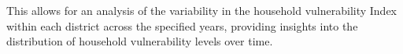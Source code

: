 This allows for an analysis of the variability in the household vulnerability Index within each district across the specified years, providing insights into the distribution of household vulnerability levels over time.
\begin{table}[htb]
	\caption{District level mean and SD HVI for all waves}
	\label{tab:districtlevelhvi}
\end{table}
